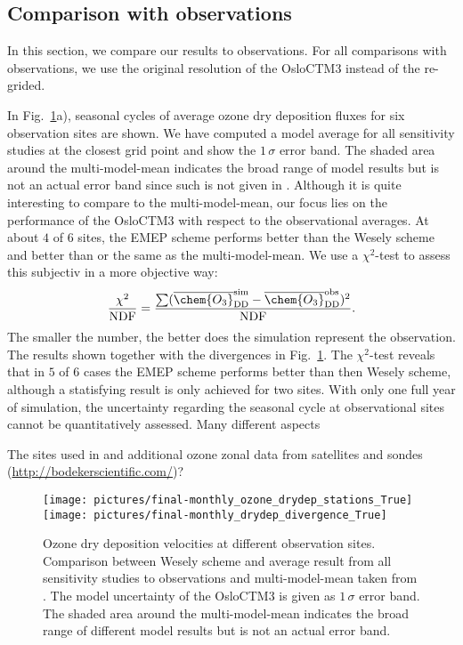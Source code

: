 \documentclass[gmd, manuscript]{copernicus}
\begin{document}
\subsection{Comparison with observations}
\label{subsec:obs}
In this section, we compare our results to observations. For all comparisons with observations, we use the original resolution of the OsloCTM3 instead of the re-grided.

In Fig.~\ref{fig:mmm_drydep_stations}a), seasonal cycles of average ozone dry deposition fluxes for six observation sites are shown. We have computed a model average for all sensitivity studies at the closest grid point and show the $1\,\sigma$ error band. The shaded area around the multi-model-mean indicates the broad range of model results but is not an actual error band since such is not given in \citet{ACP:Hardacre2015}. Although it is quite interesting to compare to the multi-model-mean, our focus lies on the performance of the OsloCTM3 with respect to the observational averages. At about $4$ of $6$ sites, the EMEP scheme performs better than the Wesely scheme and better than or the same as the multi-model-mean. We use a $\chi^2$-test to assess this subjectiv in a more objective way:
\begin{equation}
  \frac{\chi^2}{\text{NDF}} = \frac{\sum (\overline{\chem{O_3}}_\text{DD}^\text{sim}-\overline{\chem{O_3}}_\text{DD}^\text{obs})^2}{\text{NDF}}.
\end{equation}
The smaller the number, the better does the simulation represent the observation. The results shown together with the divergences in Fig.~\ref{fig:mmm_drydep_stations}. The $\chi^2$-test reveals that in $5$ of $6$ cases the EMEP scheme performs better than then Wesely scheme, although a statisfying result is only achieved for two sites.
With only one full year of simulation, the uncertainty regarding the seasonal cycle at observational sites cannot be quantitatively assessed. Many different aspects 

The sites used in \citet{ACP:Hardacre2015} and additional ozone zonal data from satellites and sondes (\url{http://bodekerscientific.com/})?

\begin{figure}[t]
  \texttt{[image: pictures/final-monthly\_ozone\_drydep\_stations\_True]}\\
  \texttt{[image: pictures/final-monthly\_drydep\_divergence\_True]}
  \caption{Ozone dry deposition velocities at different observation sites. Comparison between Wesely scheme and average result from all sensitivity studies to observations and multi-model-mean taken from \citet{ACP:Hardacre2015}. The model uncertainty of the OsloCTM3 is given as $1\,\sigma$ error band. The shaded area around the multi-model-mean indicates the broad range of different model results but is not an actual error band.}
  \label{fig:mmm_drydep_stations}
\end{figure}
\end{document}
